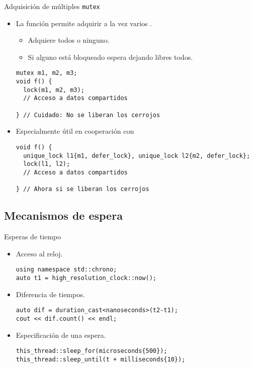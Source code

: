 \begin{frame}[fragile]{Adquisición de múltiples \texttt{mutex}}
\begin{itemize}
  \item La función  permite adquirir a la vez varios .
    \begin{itemize}
      \item Adquiere todos o ninguno.
      \item Si alguno está bloqueado espera dejando libres todos.
    \end{itemize}
\begin{lstlisting}
mutex m1, m2, m3;
void f() {
  lock(m1, m2, m3);
  // Acceso a datos compartidos

} // Cuidado: No se liberan los cerrojos
\end{lstlisting}
  \pause
  \item Especialmente útil en cooperación con 
\begin{lstlisting}
void f() {
  unique_lock l1{m1, defer_lock}, unique_lock l2{m2, defer_lock};
  lock(l1, l2);
  // Acceso a datos compartidos

} // Ahora si se liberan los cerrojos
\end{lstlisting}
\end{itemize}
\end{frame}

\subsection{Mecanismos de espera}

\begin{frame}[fragile]{Esperas de tiempo}
\begin{itemize}
  \item Acceso al reloj.
\begin{lstlisting}
using namespace std::chrono;
auto t1 = high_resolution_clock::now();
\end{lstlisting}
  \item Diferencia de tiempos.
\begin{lstlisting}
auto dif = duration_cast<nanoseconds>(t2-t1);
cout << dif.count() << endl;
\end{lstlisting}
  \item Especificación de una espera.
\begin{lstlisting}
this_thread::sleep_for(microseconds{500});
this_thread::sleep_until(t + milliseconds{10});
\end{lstlisting}
\end{itemize}
\end{frame}


